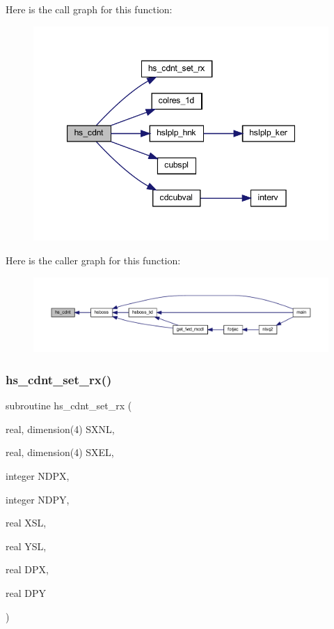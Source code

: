 Here is the call graph for this function\+:\nopagebreak
\begin{figure}[H]
\begin{center}
\leavevmode
\includegraphics[width=347pt]{Leroi_8f90_a94e83e050e27be19cb6d665d80c080bf_cgraph}
\end{center}
\end{figure}
Here is the caller graph for this function\+:\nopagebreak
\begin{figure}[H]
\begin{center}
\leavevmode
\includegraphics[width=350pt]{Leroi_8f90_a94e83e050e27be19cb6d665d80c080bf_icgraph}
\end{center}
\end{figure}
\mbox{\label{Leroi_8f90_a052539a8cd1f0d9736453c9fb65581ca}} 
\subsubsection{\texorpdfstring{hs\+\_\+cdnt\+\_\+set\+\_\+rx()}{hs\_cdnt\_set\_rx()}}
{\footnotesize\ttfamily subroutine hs\+\_\+cdnt\+\_\+set\+\_\+rx (\begin{DoxyParamCaption}\item[{real, dimension(4)}]{S\+X\+NL,  }\item[{real, dimension(4)}]{S\+X\+EL,  }\item[{integer}]{N\+D\+PX,  }\item[{integer}]{N\+D\+PY,  }\item[{real}]{X\+SL,  }\item[{real}]{Y\+SL,  }\item[{real}]{D\+PX,  }\item[{real}]{D\+PY }\end{DoxyParamCaption})}

